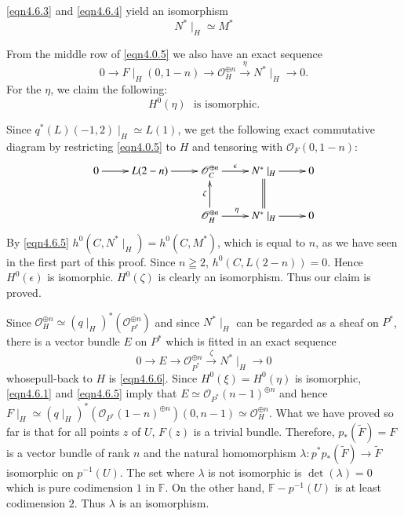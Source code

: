 \begin{Proof}
\eqref{eqn4.6.3} and \eqref{eqn4.6.4} yield an isomorphism
\begin{equation}\label{eqn4.6.5}
N^{\ast}\mid_H\simeq M^{\ast}
\end{equation}\pageoriginale

From the middle row of \eqref{eqn4.0.5} we also have an exact sequence 
\begin{equation}\label{eqn4.6.6}
0\to F\mid_{H}(0,1-n)\to \mathscr{O}^{\oplus n}_H
\xrightarrow{\eta}N^{\ast}\mid_H\to 0.
\end{equation}
For the $\eta$, we claim the following: 
\begin{equation}\label{eqn4.6.7}
H^{0}(\eta) \text{~ is isomorphic.}
\end{equation}

Since $q^{\ast}(L)(-1,2)\mid_{H}\simeq L(1)$, we get the following
exact commutative diagram by restricting \eqref{eqn4.0.5} to $H$ and
tensoring with $\mathscr{O}_F(0,1-n):$
$$
\xymatrix{0\ar[r]&L(2-n)\ar[r]&\mathscr{O}_C^{\oplus
    n}\ar[r]^-{\epsilon}&N^{\ast}\mid_H\ar[r]&0\\
& & \mathscr{O}_{H}^{\oplus
    n}\ar[u]^{\zeta}\ar[r]^{\eta}&N^{\ast}\mid_H\ar@{=}[u]\ar[r]& 0}
$$
By \eqref{eqn4.6.5}
$h^{0}\left(C,N^{\ast}\mid_H\right)=h^{0}(C,M^{\ast})$, which 
is equal to $n$, as we have seen in the first part of this
proof. Since $n\geqq 2$, $h^{0}(C,L(2-n))=0$. Hence $H^{0}(\epsilon)$
is isomorphic. $H^{0}(\zeta)$ is clearly an isomorphism. Thus our
claim is proved.

Since $\mathscr{O}^{\oplus n}_{H}\simeq
\left(q\mid_{H}\right)^{\ast}\left(\mathscr{O}_{P^{\ast}}^{\oplus
n}\right)$ and since $N^{\ast}\mid_H$ can be regarded as a sheaf on
$P^{\ast}$, there is a vector bundle $E$ on $P^{\ast}$ which is fitted
in an exact sequence  
$$
0\to E\to \mathscr{O}^{\oplus n}_{P^{\ast}}\xrightarrow{\zeta}
N^{\ast}\mid_H\to 0
$$
whose\pageoriginale pull-back to $H$ is \eqref{eqn4.6.6}. Since
$H^{0}(\xi)=H^{0}(\eta)$ is isomorphic, \ref{eqn4.6.1} and
\eqref{eqn4.6.5} imply that $E\simeq
\mathscr{O}_{P^{\ast}}(n-1)^{\oplus n}$ and hence $F\mid_H\simeq
\left(q\mid_H\right)^{\ast}(\mathscr{O}_{P^{\ast}}(1-n)^{\oplus n})(0,
n-1)\simeq \mathscr{O}_{H}^{\oplus n}$. What we have proved so far is
that for all points $z$ of $U$, $F(z)$ is a trivial bundle. Therefore,
$p_{\ast}\left(\widetilde{F}\right)=F$ is a vector bundle of rank $n$
and the natural homomorphism
$\lambda:p^{\ast}p_{\ast}\left(\widetilde{F}\right)\to \widetilde{F}$
isomorphic on $p^{-1}(U)$. The set where $\lambda$ is not isomorphic
is $\det(\lambda)=0$ which is pure codimension $1$ in $\mathbb{F}$. On
the other hand, $\mathbb{F}-p^{-1}(U)$ is at least codimension
$2$. Thus $\lambda$ is an isomorphism.
\enprf
\end{Proof}

